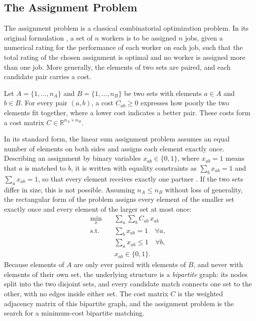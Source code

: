 \documentclass[english, egger, bsc]{vcethesis}
\begin{document}
\subsection{The Assignment Problem}
The assignment problem is a classical combinatorial optimization problem. In its original formulation \cite{kuhn1955hungarian}, a set of $n$ workers is to be assigned $n$ jobs, given a numerical rating for the performance of each worker on each job, such that the total rating of the chosen assignment is optimal and no worker is assigned more than one job. More generally, the elements of two sets are paired, and each candidate pair carries a cost.

Let $A = \{1, \dots, n_A\}$ and $B = \{1, \dots, n_B\}$ be two sets with elements $a \in A$ and $b \in B$. For every pair $(a, b)$, a cost $C_{ab} \geq 0$ expresses how poorly the two elements fit together, where a lower cost indicates a better pair. These costs form a cost matrix $C \in  \mathbb{R}^{n_A \times n_B}$.

In its standard form, the linear sum assignment problem assumes an equal number of elements on both sides and assigns each element exactly once. Describing an assignment by binary variables $x_{ab} \in \{0, 1\}$, where $x_{ab} = 1$ means that $a$ is matched to $b$, it is written with equality constraints as $\sum_b x_{ab} = 1$ and $\sum_a x_{ab} = 1$, so that every element receives exactly one partner \cite{burkard2009assignment}. 
If the two sets differ in size, this is not possible. Assuming $n_A \leq n_B$ without loss of generality, the rectangular form of the problem assigns every element of the smaller set exactly once and every element of the larger set at most once:
\begin{align}
    \label{eq:assignment}
        \min_{x} \quad & \sum_{a} \sum_{b} C_{ab} \, x_{ab} \\
        \text{s.t.} \quad & \sum_{b} x_{ab} = 1 \quad \forall a, \nonumber\\
        & \sum_{a} x_{ab} \leq 1 \quad \forall b, \nonumber\\
        & x_{ab} \in \{0, 1\}. \nonumber
\end{align}
Because elements of $A$ are only ever paired with elements of $B$, and never with elements of their own set, the underlying structure is a \emph{bipartite} graph: its nodes split into the two disjoint sets, and every candidate match connects one set to the other, with no edges inside either set. The cost matrix $C$ is the weighted adjacency matrix of this bipartite graph, and the assignment problem is the search for a minimum-cost bipartite matching.
\end{document}
